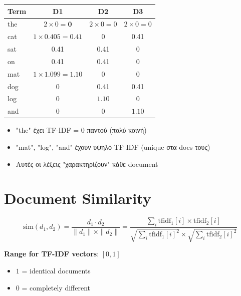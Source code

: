\begin{center}
\begin{tabular}{l|ccc}
\toprule
Term & D1 & D2 & D3 \\
\midrule
the & $2 \times 0 = \mathbf{0}$ & $2 \times 0 = 0$ & $2 \times 0 = 0$ \\
cat & $1 \times 0.405 = 0.41$ & 0 & 0.41 \\
sat & 0.41 & 0.41 & 0 \\
on & 0.41 & 0.41 & 0 \\
\rowcolor{success!20} mat & $1 \times 1.099 = \mathbf{1.10}$ & 0 & 0 \\
dog & 0 & 0.41 & 0.41 \\
\rowcolor{success!20} log & 0 & $\mathbf{1.10}$ & 0 \\
\rowcolor{success!20} and & 0 & 0 & $\mathbf{1.10}$ \\
\bottomrule
\end{tabular}
\end{center}

\begin{infobox}[Παρατηρήσεις]
\begin{itemize}
    \item "the" έχει TF-IDF = 0 παντού (πολύ κοινή)
    \item "mat", "log", "and" έχουν υψηλό TF-IDF (unique στα docs τους)
    \item Αυτές οι λέξεις "χαρακτηρίζουν" κάθε document
\end{itemize}
\end{infobox}

\section{Document Similarity}

\begin{formulabox}
\begin{equation}
\text{sim}(d_1, d_2) = \frac{d_1 \cdot d_2}{\|d_1\| \times \|d_2\|} = \frac{\sum_i \text{tfidf}_1[i] \times \text{tfidf}_2[i]}{\sqrt{\sum_i \text{tfidf}_1[i]^2} \times \sqrt{\sum_i \text{tfidf}_2[i]^2}}
\end{equation}

\textbf{Range for TF-IDF vectors}: $[0, 1]$
\begin{itemize}
    \item $1$ = identical documents
    \item $0$ = completely different
\end{itemize}
\end{formulabox}

